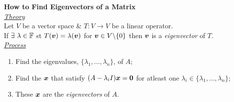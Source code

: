 \documentclass[11pt,a4paper]{article}
\begin{document}
\textbf{How to Find Eigenvectors of a Matrix}\\

\underline{\textit{Theory}}\\
Let $V$ be a vector space \& $T : V \to V$ be a linear operator.\\
If $\exists\ \lambda \in \mathbb{F}$ st $T(\boldsymbol{v}) = \lambda(\boldsymbol{v})$ for $\boldsymbol{v} \in V\backslash\{0\}$ then $\boldsymbol{v}$ is a \textit{eigenvector} of $T$.\\

\underline{\textit{Process}}
\begin{enumerate}[label=\roman*)]\itemsep0em
  \item Find the eigenvalues, $\{\lambda_1, \dots, \lambda_n \}$, of $A$;
  \item Find the $\boldsymbol{x}$ that satisfy $(A - \lambda_iI)\boldsymbol{x} = \boldsymbol{0}$ for atleast one $\lambda_i \in \{\lambda_1, \dots, \lambda_n \}$;
  \item These $\boldsymbol{x}$ are the \textit{eigenvectors} of $A$.
\end{enumerate}
\end{document}
